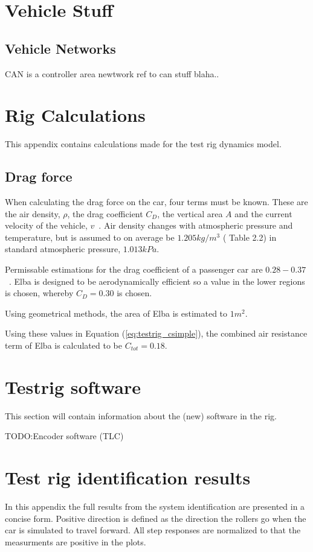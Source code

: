 \chapter{Vehicle Stuff}\label{appA}

\section{Vehicle Networks}
CAN is a controller area newtwork ref to can stuff blaha..

\chapter{Rig Calculations}\label{app:rigdata}
This appendix contains calculations made for the test rig dynamics model. 

\section*{Drag force}
When calculating the drag force on the car, four terms must be known.
These are the air density, $\rho$, the drag coefficient $C_D$, the vertical area
$A$ and the current velocity of the vehicle, $v$~\cite{nakayama2002}. Air
density changes with atmospheric pressure and temperature, but is assumed to on
average be $1.205\si{kg/m^3}$ (\cite{nakayama2002} Table 2.2) in standard
atmospheric pressure, $1.013\si{kPa}$. 

Permissable estimations for the drag coefficient of a passenger car are
$0.28-0.37$~\cite{nakayama2002}. Elba is designed to be aerodynamically
efficient so a value in the lower regions is chosen, whereby $C_D = 0.30$ is
chosen.

Using geometrical methods, the area of Elba is estimated to $1\si{m^2}$.

Using these values in Equation (\ref{eq:testrig_csimple}), the combined air
resistance term of Elba is calculated to be $C_{tot} = 0.18$.

\chapter{Testrig software}
This section will contain information about the (new) software in the rig.

TODO\@:Encoder software (TLC)

\chapter{Test rig identification results}
In this appendix the full results from the system identification are presented
in a concise form. Positive direction is defined as the direction the rollers go
when the car is simulated to travel forward. All step responses are normalized
to that the measurments are positive in the plots.

